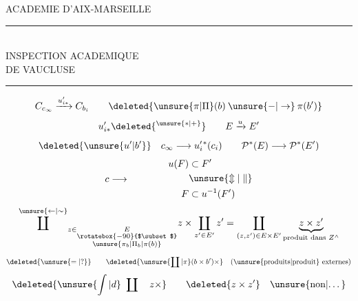 \begin{center}
ACADEMIE D'AIX-MARSEILLE\\
\rule{4em}{0.4pt}\\
INSPECTION ACADEMIQUE\\
DE VAUCLUSE\\
\rule{1.6em}{0.4pt}
\end{center}
\[
 C_{c_\infty}\xrightarrow{u'_{i*}}C_{b_i}
 \qquad \deleted{\unsure{\pi|\Pi}(b)\mathbin{\unsure{-|\to}}\pi(b')}
\]
\[
 u'_{i*}\deleted{^{\unsure{*|+}}}
 \qquad E\xrightarrow{u}E'
\]
\[
 \deleted{\unsure{u'|b'}}\quad c_\infty\longrightarrow u'_i{}^{*}(c_i)
 \qquad \mathcal P^*(E)\longrightarrow\mathcal P^*(E')
\]
\[
 c\longrightarrow\qquad\qquad
 \begin{aligned}
 u(F)&\subset F'\\
 &\unsure{\Updownarrow|\parallel}\\
 F&\subset u^{-1}(F')
 \end{aligned}
\]
\[
 \overset{\unsure{\leftarrow|\sim}}{\coprod}_{z\in\underset{\substack{\rotatebox{-90}{$\subset$}\\\unsure{\pi_b|\Pi_b|\pi(b)}}}{E}}z
 \times\coprod_{z'\in E'}z'
 =\coprod_{(z,z')\in E\times E'}\underbrace{z\times z'}_{\text{produit dans }Z^\wedge}
\]
\[
 \deleted{\unsure{=|?}}\qquad
 \deleted{\unsure{\coprod|\pi}(b\times b')\times}\quad
 \text{(\unsure{produits|produit} externes)}
\]
\[
 \deleted{\unsure{\int|d}\ \coprod\quad z\times}
 \qquad \deleted{z\times z'}\quad\text{\unsure{non|…}}
\]

